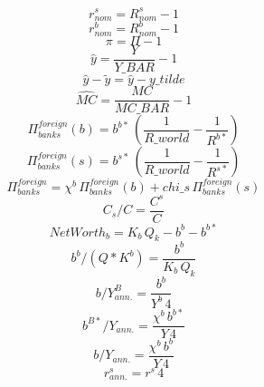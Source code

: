 \begin{dmath}
{ r^s_{nom}}={ R^s_{nom}}-1
\end{dmath}
\begin{dmath}
{ r^b_{nom}}={ R^b_{nom}}-1
\end{dmath}
\begin{dmath}
{ \pi }={ \Pi }-1
\end{dmath}
\begin{dmath}
{ \hat{y} }=\frac{{Y}}{{Y\_BAR}}-1
\end{dmath}
\begin{dmath}
{ \hat{y} - \tilde{y} }={ \hat{y} }-{y\_tilde}
\end{dmath}
\begin{dmath}
{ \hat{MC} }=\frac{{MC}}{{MC\_BAR}}-1
\end{dmath}
\begin{dmath}
{\Pi^{foreign}_{banks}(b)}={b^{b*}}\, \left(\frac{1}{{R\_world}}-\frac{1}{{R^{b*}}}\right)
\end{dmath}
\begin{dmath}
{\Pi^{foreign}_{banks}(s)}={b^{s*}}\, \left(\frac{1}{{R\_world}}-\frac{1}{{R^{s*}}}\right)
\end{dmath}
\begin{dmath}
{\Pi^{foreign}_{banks}}={\chi^b }\, {\Pi^{foreign}_{banks}(b)}+{chi\_s}\, {\Pi^{foreign}_{banks}(s)}
\end{dmath}
\begin{dmath}
{ C_s / C  }=\frac{{C^s}}{{C}}
\end{dmath}
\begin{dmath}
{ NetWorth_b }={K_b}\, { Q_k }-{b^b}-{b^{b*}}
\end{dmath}
\begin{dmath}
{ b^b / (Q * K^b) }=\frac{{b^b}}{{K_b}\, { Q_k }}
\end{dmath}
\begin{dmath}
{ b / Y^B_{ann.} }=\frac{{b^b}}{{Y^b}\, 4}
\end{dmath}
\begin{dmath}
{ b^{B*}/ Y_{ann.} }=\frac{{\chi^b }\, {b^{b*}}}{{Y}\, 4}
\end{dmath}
\begin{dmath}
{b/ Y_{ann.} }=\frac{{\chi^b }\, {b^b}}{{Y}\, 4}
\end{dmath}
\begin{dmath}
{r^s_{ann.}}={r^s}\, 4
\end{dmath}

